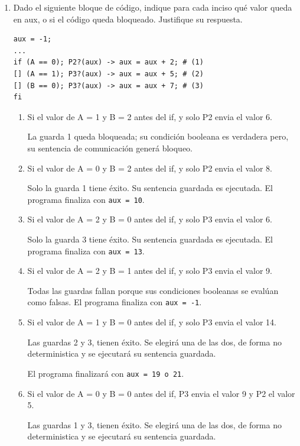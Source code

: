 \documentclass[a4paper, 10pt]{article}
\newenvironment{QandA}{
    \begin{enumerate}\bfseries}
    {\end{enumerate}
}
\newenvironment{answered}{\par\normalfont}{}
\begin{document}
\begin{QandA}
\item Dado el siguiente bloque de código, indique para cada inciso qué valor queda en aux, o si el código queda bloqueado. Justifique su respuesta.

\begin{lstlisting}
aux = -1;
...
if (A == 0); P2?(aux) -> aux = aux + 2; # (1)
[] (A == 1); P3?(aux) -> aux = aux + 5; # (2)
[] (B == 0); P3?(aux) -> aux = aux + 7; # (3)
fi
\end{lstlisting}
\begin{enumerate}
\item Si el valor de A = 1 y B = 2 antes del if, y solo P2 envia el valor 6.
\begin{answered}
La guarda 1 queda bloqueada; su condición booleana es verdadera pero, su sentencia de comunicación generá bloqueo.
\end{answered}
\item Si el valor de A = 0 y B = 2 antes del if, y solo P2 envia el valor 8.
\begin{answered}
Solo la guarda 1 tiene éxito. Su sentencia guardada es ejecutada. El programa finaliza con \lstinline{aux = 10}.
\end{answered}
\item Si el valor de A = 2 y B = 0 antes del if, y solo P3 envia el valor 6.
\begin{answered}
Solo la guarda 3 tiene éxito. Su sentencia guardada es ejecutada. El programa finaliza con \lstinline{aux = 13}.
\end{answered}
\item Si el valor de A = 2 y B = 1 antes del if, y solo P3 envia el valor 9.
\begin{answered}
Todas las guardas fallan porque sus condiciones booleanas se evalúan como falsas. El programa finaliza con \lstinline{aux = -1}.
\end{answered}
\item Si el valor de A = 1 y B = 0 antes del if, y solo P3 envia el valor 14.
\begin{answered}
Las guardas 2 y 3, tienen éxito. Se elegirá una de las dos, de forma no deterministica y se ejecutará su sentencia guardada.

El programa finalizará con \lstinline{aux = 19 o 21}.
\end{answered}
\item Si el valor de A = 0 y B = 0 antes del if, P3 envia el valor 9 y P2 el valor 5.
\begin{answered}
Las guardas 1 y 3, tienen éxito. Se elegirá una de las dos, de forma no deterministica y se ejecutará su sentencia guardada.
    

\end{answered}
\end{enumerate}
\end{QandA}
\end{document}
